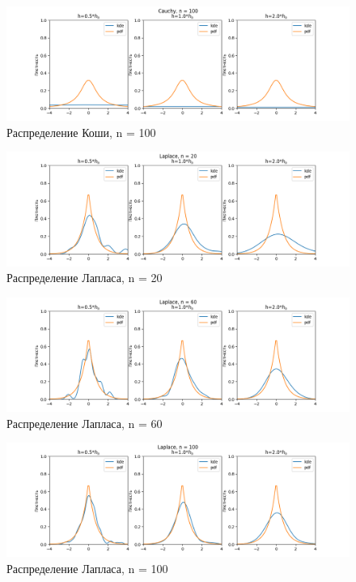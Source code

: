 \documentclass[12pt]{article}
\begin{document}
\begin{figure}
  \centering
  \includegraphics[width=0.8\paperwidth ]{images/kde/Cauchy_100.png}
  \caption{Распределение Коши, n = 100}
\end{figure}

\begin{figure}
  \centering
  \includegraphics[width=0.8\paperwidth ]{images/kde/Laplace_20.png}
  \caption{Распределение Лапласа, n = 20}
\end{figure}

\begin{figure}
  \centering
  \includegraphics[width=0.8\paperwidth ]{images/kde/Laplace_60.png}
  \caption{Распределение Лапласа, n = 60}
\end{figure}

\begin{figure}
  \centering
  \includegraphics[width=0.8\paperwidth ]{images/kde/Laplace_100.png}
  \caption{Распределение Лапласа, n = 100}
\end{figure}
\end{document}
